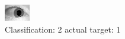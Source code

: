 \begin{figure}[h!]
\begin{center}
\includegraphics[width=0.60\columnwidth]{figures/ID1556_class_2_target_1.png}
\end{center}
\caption{ Classification: 2 actual target: 1}
\label{fig:ID1556_class_2_target_1}
\end{figure}
